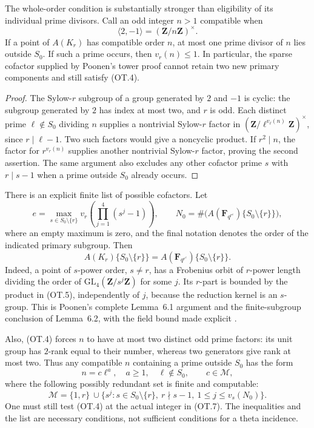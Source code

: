 The whole-order condition is substantially stronger than
eligibility of its individual prime divisors.  Call an odd
integer $n>1$ compatible when
\[
                   \langle2,-1\rangle
                      =(\mathbf Z/n\mathbf Z)^\times.
 \tag{OT.4}
\]
If a point of $A(K_r)$ has compatible order $n$, at most one
prime divisor of $n$ lies outside $S_0$.  If such a prime occurs,
then $v_r(n)\le1$.  In particular, the sparse cofactor supplied by
Poonen's tower proof cannot retain two new primary components
and still satisfy (OT.4).

\begin{proof}
The Sylow-$r$ subgroup of a group generated by $2$ and $-1$ is
cyclic: the subgroup generated by $2$ has index at most two,
and $r$ is odd.  Each distinct prime $\ell\notin S_0$ dividing
$n$ supplies a nontrivial Sylow-$r$ factor in
$(\mathbf Z/\ell^{v_\ell(n)}\mathbf Z)^\times$, since
$r\mid\ell-1$.  Two such factors would give a noncyclic product.
If $r^2\mid n$, the factor for $r^{v_r(n)}$ supplies another
nontrivial Sylow-$r$ factor, proving the second assertion.
The same argument also excludes any other cofactor prime $s$
with $r\mid s-1$ when a prime outside $S_0$ already occurs.
\end{proof}

There is an explicit finite list of possible cofactors.  Let
\[
 e=\max_{s\in S_0\setminus\{r\}}
       v_r\!\left(\prod_{j=1}^4(s^j-1)\right),
 \qquad
 N_0=\#\bigl(A(\mathbf F_{q^{r^e}})\{S_0\setminus\{r\}\}\bigr),
 \tag{OT.5}
\]
where an empty maximum is zero, and the final notation denotes
the order of the indicated primary subgroup.  Then
\[
 A(K_r)\{S_0\setminus\{r\}\}
  =A(\mathbf F_{q^{r^e}})\{S_0\setminus\{r\}\}.
 \tag{OT.6}
\]
Indeed, a point of $s$-power order, $s\ne r$, has a Frobenius
orbit of $r$-power length dividing the order of
$\mathrm{GL}_4(\mathbf Z/s^j\mathbf Z)$ for some $j$.
Its $r$-part is bounded by the product in (OT.5), independently
of $j$, because the reduction kernel is an $s$-group.  This is
Poonen's complete Lemma~6.1 argument and the finite-subgroup
conclusion of Lemma~6.2, with the field bound made explicit
\cite[Lemmas~6.1--6.2]{Poonen2005}.

Also, (OT.4) forces $n$ to have at most two distinct odd prime
factors: its unit group has $2$-rank equal to their number,
whereas two generators give rank at most two.  Thus any compatible
$n$ containing a prime outside $S_0$ has the form
\[
 n=c\ell^a,\quad a\ge1,\quad \ell\notin S_0,\qquad
 c\in\mathcal M,
 \tag{OT.7}
\]
where the following possibly redundant set is finite and
computable:
\[
 \mathcal M=\{1,r\}\ \cup
 \{s^j:s\in S_0\setminus\{r\},\ r\nmid s-1,
                         \ 1\le j\le v_s(N_0)\}.
 \tag{OT.8}
\]
One must still test (OT.4) at the actual integer in (OT.7).
The inequalities and the list are necessary conditions, not
sufficient conditions for a theta incidence.


